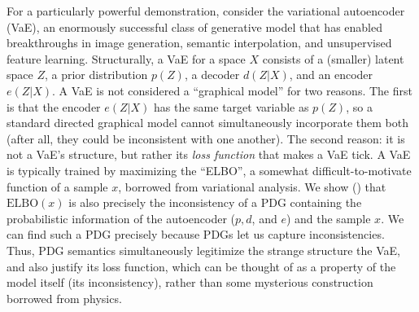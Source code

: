 \documentclass[twoside]{article}
\theoremstyle{plain}
\theoremstyle{definition}
\begin{document}

For a particularly powerful demonstration, consider the variational
autoencoder (VaE), an enormously successful class of generative model
that has enabled breakthroughs in image generation, semantic
interpolation, and unsupervised feature learning. 
Structurally, a VaE for a space $X$ consists of a (smaller) latent space $Z$, a prior distribution $p(Z)$, a decoder $d(Z | X)$, and an encoder $e(Z| X)$.
A VaE is not considered a ``graphical model'' for two reasons.
The first is that the encoder $e(Z|X)$ has the same target variable as $p(Z)$, so a standard directed graphical model cannot simultaneously incorporate them both (after all, they could be inconsistent with one another).
The second reason: it is not a VaE's structure, but rather its \emph{loss function} that makes a VaE tick. A VaE is typically trained by 
maximizing the ``ELBO'', 
    a somewhat difficult-to-motivate function of a sample $x$, borrowed from variational analysis.
    We show () that $\mathrm{ELBO}(x)$ is also
    precisely the inconsistency of a PDG containing the probabilistic
    information of the autoencoder ($p, d$, and $e$) and the sample $x$.
We can find such a PDG precisely because PDGs let us capture
inconsistencies.     
Thus, PDG semantics simultaneously legitimize the strange structure
the VaE, and also justify its loss function, which can be thought of
as a property of the model itself (its inconsistency), rather than
some mysterious construction borrowed from physics. 
\end{document}
